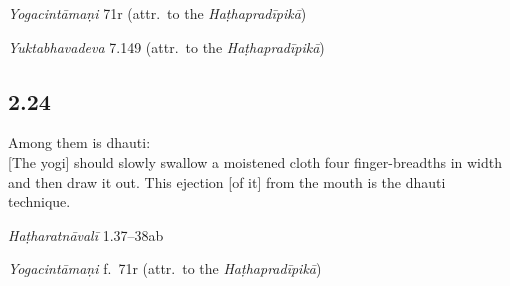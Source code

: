 \begin{ekdosis}
\begin{testimonia}[hp02_023]
\emph{Yogacintāmaṇi} 71r (attr.~to the \emph{Haṭhapradīpikā})

\begin{versinnote}
\end{versinnote}

\emph{Yuktabhavadeva} 7.149 (attr.~to the \emph{Haṭhapradīpikā})

\begin{versinnote}
\end{versinnote}

\end{testimonia}

\begin{philcomm}[hp02_023]
\end{philcomm}

\subsection*{2.24}
\begin{translation}[hp02_024]
Among them is dhauti:\\ 
{}[The yogi] should slowly swallow a moistened cloth  four finger-breadths in width and then draw it out. This ejection [of it] from the mouth is the dhauti technique.
\end{translation}


\begin{testimonia}[hp02_024]
\emph{Haṭharatnāvalī} 1.37–38ab

\begin{versinnote}
\end{versinnote} 

\emph{Yogacintāmaṇi} f.~71r (attr.~to the \emph{Haṭhapradīpikā})


\end{testimonia}
\end{ekdosis}
